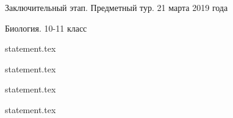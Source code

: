 \documentclass[a4paper,11pt, oneside]{book}
\begin{document}
\vspace{-3mm}
\vspace{-5mm}

\normalsize

\begin{center}
    Заключительный этап. Предметный тур. 21 марта 2019 года
    
    Биология. 10-11 класс
\end{center}

\parindent=0cm

%

{statement.tex}

\newpage

{statement.tex}

{statement.tex}

\newpage

{statement.tex}
\end{document}
